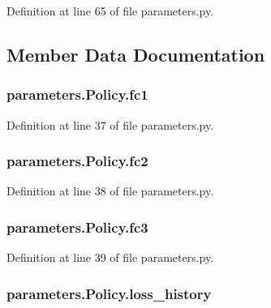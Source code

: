 Definition at line 65 of file parameters.\+py.



\subsection{Member Data Documentation}
\subsubsection[{\texorpdfstring{fc1}{fc1}}]{\setlength{\rightskip}{0pt plus 5cm}parameters.\+Policy.\+fc1}\hypertarget{classparameters_1_1_policy_a6e2321584d126eb24b470a0c38ec5e15}{}\label{classparameters_1_1_policy_a6e2321584d126eb24b470a0c38ec5e15}


Definition at line 37 of file parameters.\+py.

\subsubsection[{\texorpdfstring{fc2}{fc2}}]{\setlength{\rightskip}{0pt plus 5cm}parameters.\+Policy.\+fc2}\hypertarget{classparameters_1_1_policy_a536f2d0eb9e96828c15ef06ea5f6a3ab}{}\label{classparameters_1_1_policy_a536f2d0eb9e96828c15ef06ea5f6a3ab}


Definition at line 38 of file parameters.\+py.

\subsubsection[{\texorpdfstring{fc3}{fc3}}]{\setlength{\rightskip}{0pt plus 5cm}parameters.\+Policy.\+fc3}\hypertarget{classparameters_1_1_policy_a79b2258957c43c5863d8df9f5a1b8948}{}\label{classparameters_1_1_policy_a79b2258957c43c5863d8df9f5a1b8948}


Definition at line 39 of file parameters.\+py.

\subsubsection[{\texorpdfstring{loss\+\_\+history}{loss_history}}]{\setlength{\rightskip}{0pt plus 5cm}parameters.\+Policy.\+loss\+\_\+history}\hypertarget{classparameters_1_1_policy_a9727567f44cbe8bf617ff4020e40fbb7}{}\label{classparameters_1_1_policy_a9727567f44cbe8bf617ff4020e40fbb7}


